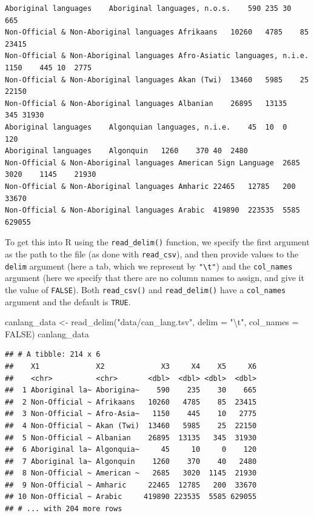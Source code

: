 \documentclass[
]{krantz}
\makeatletter
\newenvironment{Shaded}{\begin{snugshade}}{\end{snugshade}}
\newcommand{\AttributeTok}[1]{\textcolor[rgb]{0.61,0.61,0.61}{#1}}
\newcommand{\ConstantTok}[1]{\textcolor[rgb]{0,0,0}{#1}}
\newcommand{\FunctionTok}[1]{\textcolor[rgb]{0,0,0}{#1}}
\newcommand{\NormalTok}[1]{#1}
\newcommand{\OtherTok}[1]{\textcolor[rgb]{0.37,0.37,0.37}{#1}}
\newcommand{\SpecialCharTok}[1]{\textcolor[rgb]{0,0,0}{#1}}
\newcommand{\StringTok}[1]{\textcolor[rgb]{0.5,0.5,0.5}{#1}}
\newenvironment{kframe}{%
\medskip{}
\setlength{\fboxsep}{.8em}
 \def\at@end@of@kframe{}%
 \ifinner\ifhmode%
  \def\at@end@of@kframe{\end{minipage}}%
  \begin{minipage}{\columnwidth}%
 \fi\fi%
 \def\FrameCommand##1{\hskip\@totalleftmargin \hskip-\fboxsep
 \colorbox{shadecolor}{##1}\hskip-\fboxsep
     \hskip-\linewidth \hskip-\@totalleftmargin \hskip\columnwidth}%
 \MakeFramed {\advance\hsize-\width
   \@totalleftmargin\z@ \linewidth\hsize
   \@setminipage}}%
 {\par\unskip\endMakeFramed%
 \at@end@of@kframe}
\renewenvironment{Shaded}{\begin{kframe}}{\end{kframe}}
\makeatother
\begin{document}
\begin{verbatim}
Aboriginal languages    Aboriginal languages, n.o.s.    590 235 30  665
Non-Official & Non-Aboriginal languages Afrikaans   10260   4785    85  23415
Non-Official & Non-Aboriginal languages Afro-Asiatic languages, n.i.e.  1150    445 10  2775
Non-Official & Non-Aboriginal languages Akan (Twi)  13460   5985    25  22150
Non-Official & Non-Aboriginal languages Albanian    26895   13135   345 31930
Aboriginal languages    Algonquian languages, n.i.e.    45  10  0   120
Aboriginal languages    Algonquin   1260    370 40  2480
Non-Official & Non-Aboriginal languages American Sign Language  2685    3020    1145    21930
Non-Official & Non-Aboriginal languages Amharic 22465   12785   200 33670
Non-Official & Non-Aboriginal languages Arabic  419890  223535  5585    629055
\end{verbatim}

To get this into R using the \texttt{read\_delim()} function, we specify the first argument as the path to the file (as done with \texttt{read\_csv}), and then provide values to the \texttt{delim} argument (here a tab, which we represent by \texttt{"\textbackslash{}t"}) and the \texttt{col\_names} argument (here we specify that there are no column names to assign, and give it the value of \texttt{FALSE}). Both \texttt{read\_csv()} and \texttt{read\_delim()} have a \texttt{col\_names} argument and the default is \texttt{TRUE}.

\begin{Shaded}
\begin{Highlighting}[]
\NormalTok{canlang\_data }\OtherTok{\textless{}{-}} \FunctionTok{read\_delim}\NormalTok{(}\StringTok{"data/can\_lang.tsv"}\NormalTok{, }\AttributeTok{delim =} \StringTok{"}\SpecialCharTok{\textbackslash{}t}\StringTok{"}\NormalTok{, }\AttributeTok{col\_names =} \ConstantTok{FALSE}\NormalTok{)}
\NormalTok{canlang\_data}
\end{Highlighting}
\end{Shaded}

\begin{verbatim}
## # A tibble: 214 x 6
##    X1             X2             X3     X4    X5     X6
##    <chr>          <chr>       <dbl>  <dbl> <dbl>  <dbl>
##  1 Aboriginal la~ Aborigina~    590    235    30    665
##  2 Non-Official ~ Afrikaans   10260   4785    85  23415
##  3 Non-Official ~ Afro-Asia~   1150    445    10   2775
##  4 Non-Official ~ Akan (Twi)  13460   5985    25  22150
##  5 Non-Official ~ Albanian    26895  13135   345  31930
##  6 Aboriginal la~ Algonquia~     45     10     0    120
##  7 Aboriginal la~ Algonquin    1260    370    40   2480
##  8 Non-Official ~ American ~   2685   3020  1145  21930
##  9 Non-Official ~ Amharic     22465  12785   200  33670
## 10 Non-Official ~ Arabic     419890 223535  5585 629055
## # ... with 204 more rows
\end{verbatim}
\end{document}

